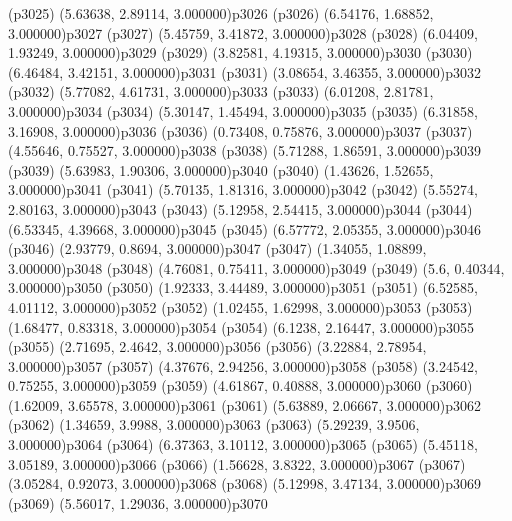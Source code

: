 \psdot(p3025)
\psPoint(5.63638, 2.89114, 3.000000){p3026}
\psdot(p3026)
\psPoint(6.54176, 1.68852, 3.000000){p3027}
\psdot(p3027)
\psPoint(5.45759, 3.41872, 3.000000){p3028}
\psdot(p3028)
\psPoint(6.04409, 1.93249, 3.000000){p3029}
\psdot(p3029)
\psPoint(3.82581, 4.19315, 3.000000){p3030}
\psdot(p3030)
\psPoint(6.46484, 3.42151, 3.000000){p3031}
\psdot(p3031)
\psPoint(3.08654, 3.46355, 3.000000){p3032}
\psdot(p3032)
\psPoint(5.77082, 4.61731, 3.000000){p3033}
\psdot(p3033)
\psPoint(6.01208, 2.81781, 3.000000){p3034}
\psdot(p3034)
\psPoint(5.30147, 1.45494, 3.000000){p3035}
\psdot(p3035)
\psPoint(6.31858, 3.16908, 3.000000){p3036}
\psdot(p3036)
\psPoint(0.73408, 0.75876, 3.000000){p3037}
\psdot(p3037)
\psPoint(4.55646, 0.75527, 3.000000){p3038}
\psdot(p3038)
\psPoint(5.71288, 1.86591, 3.000000){p3039}
\psdot(p3039)
\psPoint(5.63983, 1.90306, 3.000000){p3040}
\psdot(p3040)
\psPoint(1.43626, 1.52655, 3.000000){p3041}
\psdot(p3041)
\psPoint(5.70135, 1.81316, 3.000000){p3042}
\psdot(p3042)
\psPoint(5.55274, 2.80163, 3.000000){p3043}
\psdot(p3043)
\psPoint(5.12958, 2.54415, 3.000000){p3044}
\psdot(p3044)
\psPoint(6.53345, 4.39668, 3.000000){p3045}
\psdot(p3045)
\psPoint(6.57772, 2.05355, 3.000000){p3046}
\psdot(p3046)
\psPoint(2.93779, 0.8694, 3.000000){p3047}
\psdot(p3047)
\psPoint(1.34055, 1.08899, 3.000000){p3048}
\psdot(p3048)
\psPoint(4.76081, 0.75411, 3.000000){p3049}
\psdot(p3049)
\psPoint(5.6, 0.40344, 3.000000){p3050}
\psdot(p3050)
\psPoint(1.92333, 3.44489, 3.000000){p3051}
\psdot(p3051)
\psPoint(6.52585, 4.01112, 3.000000){p3052}
\psdot(p3052)
\psPoint(1.02455, 1.62998, 3.000000){p3053}
\psdot(p3053)
\psPoint(1.68477, 0.83318, 3.000000){p3054}
\psdot(p3054)
\psPoint(6.1238, 2.16447, 3.000000){p3055}
\psdot(p3055)
\psPoint(2.71695, 2.4642, 3.000000){p3056}
\psdot(p3056)
\psPoint(3.22884, 2.78954, 3.000000){p3057}
\psdot(p3057)
\psPoint(4.37676, 2.94256, 3.000000){p3058}
\psdot(p3058)
\psPoint(3.24542, 0.75255, 3.000000){p3059}
\psdot(p3059)
\psPoint(4.61867, 0.40888, 3.000000){p3060}
\psdot(p3060)
\psPoint(1.62009, 3.65578, 3.000000){p3061}
\psdot(p3061)
\psPoint(5.63889, 2.06667, 3.000000){p3062}
\psdot(p3062)
\psPoint(1.34659, 3.9988, 3.000000){p3063}
\psdot(p3063)
\psPoint(5.29239, 3.9506, 3.000000){p3064}
\psdot(p3064)
\psPoint(6.37363, 3.10112, 3.000000){p3065}
\psdot(p3065)
\psPoint(5.45118, 3.05189, 3.000000){p3066}
\psdot(p3066)
\psPoint(1.56628, 3.8322, 3.000000){p3067}
\psdot(p3067)
\psPoint(3.05284, 0.92073, 3.000000){p3068}
\psdot(p3068)
\psPoint(5.12998, 3.47134, 3.000000){p3069}
\psdot(p3069)
\psPoint(5.56017, 1.29036, 3.000000){p3070}
